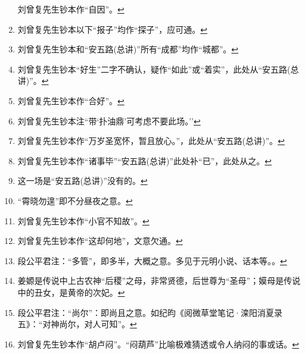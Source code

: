\begin{enumerate}
  \leavevmode\hypertarget{fn228}{}%
  刘曾复先生钞本作``自因''。\protect\hyperlink{fnref228}{↩}
\item
  \leavevmode\hypertarget{fn229}{}%
  刘曾复先生钞本以下``报子''均作``探子''，应可通。\protect\hyperlink{fnref229}{↩}
\item
  \leavevmode\hypertarget{fn230}{}%
  刘曾复先生钞本和``安五路(总讲)''所有``成都''均作``城都''。\protect\hyperlink{fnref230}{↩}
\item
  \leavevmode\hypertarget{fn231}{}%
  刘曾复先生钞本``好生''二字不确认，疑作``如此''或``着实''，此处从``安五路(总讲)''。\protect\hyperlink{fnref231}{↩}
\item
  \leavevmode\hypertarget{fn232}{}%
  刘曾复先生钞本作``合好''。\protect\hyperlink{fnref232}{↩}
\item
  \leavevmode\hypertarget{fn233}{}%
  刘曾复先生钞本注``带`扑油鼎'可考虑不要此场。''\protect\hyperlink{fnref233}{↩}
\item
  \leavevmode\hypertarget{fn234}{}%
  刘曾复先生钞本作``万岁圣宽怀，暂且放心。''，此处从``安五路(总讲)''。\protect\hyperlink{fnref234}{↩}
\item
  \leavevmode\hypertarget{fn235}{}%
  刘曾复先生钞本作``诸事毕''``安五路(总讲)''此处补``已''，此处从之。\protect\hyperlink{fnref235}{↩}
\item
  \leavevmode\hypertarget{fn236}{}%
  这一场是``安五路(总讲)''没有的。\protect\hyperlink{fnref236}{↩}
\item
  \leavevmode\hypertarget{fn237}{}%
  ``霄晓勿遑''即不分昼夜之意。\protect\hyperlink{fnref237}{↩}
\item
  \leavevmode\hypertarget{fn238}{}%
  刘曾复先生钞本作``小官不知故''。\protect\hyperlink{fnref238}{↩}
\item
  \leavevmode\hypertarget{fn239}{}%
  刘曾复先生钞本作``这却何地''，文意欠通。\protect\hyperlink{fnref239}{↩}
\item
  \leavevmode\hypertarget{fn240}{}%
  段公平君注：``多管''，即多半，大概之意。多见于元明小说、话本等。。\protect\hyperlink{fnref240}{↩}
\item
  \leavevmode\hypertarget{fn241}{}%
  姜嫄是传说中上古农神``后稷''之母，非常贤德，后世尊为``圣母''；嫫母是传说中的丑女，是黄帝的次妃。\protect\hyperlink{fnref241}{↩}
\item
  \leavevmode\hypertarget{fn242}{}%
  段公平君注：``尚尔''：即尚且之意。如纪昀《阅微草堂笔记·滦阳消夏录五》：``对神尚尔，对人可知''。\protect\hyperlink{fnref242}{↩}
\item
  \leavevmode\hypertarget{fn243}{}%
  刘曾复先生钞本作``胡卢闷''。``闷葫芦''比喻极难猜透或令人纳闷的事或话。\protect\hyperlink{fnref243}{↩}

\end{enumerate}
